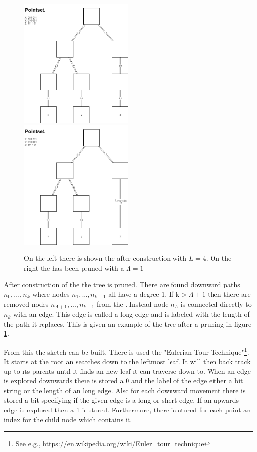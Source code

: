 \begin{figure}
	\includegraphics[width=0.5\textwidth]{figures/quadtree}
	\includegraphics[width=0.5\textwidth]{figures/prunnedquadtree}
	\caption{On the left there is shown the \qt{} after construction with $L=4$. On the right the \qt{} has been pruned with a $\Lambda = 1$}
	\label{fig:quadtree}
\end{figure}

After construction of the \qt{} the tree is pruned. There are found downward paths $n_0,...,n_k$ where nodes $n_1,...,n_{k-1}$ all have a degree 1. If \ensuremath{\texttt{k} > \Lambda+1} then there are removed nodes $n_{\Lambda+1},...,n_{k-1}$ from the \qt{}. Instead node $n_{\Lambda}$ is connected directly to $n_{k}$ with an edge. This edge is called a long edge and is labeled with the length of the path it replaces. This is given an example of the tree after a pruning in figure \ref{fig:quadtree}.


From this the sketch can be built. There is used the "Eulerian Tour Technique"\footnote{See e.g., \url{https://en.wikipedia.org/wiki/Euler\_tour\_technique}}.
It starts at the root an searches down to the leftmost leaf. It will then back track up to its parents until it finds an new leaf it can traverse down to. When an edge is explored downwards there is stored a 0 and the label of the edge either a bit string or the length of an long edge. Also for each downward movement there is stored a bit specifying if the given edge is a long or short edge. If an upwards edge is explored then a 1 is stored. Furthermore, there is stored for each point an index for the child node which contains it.

